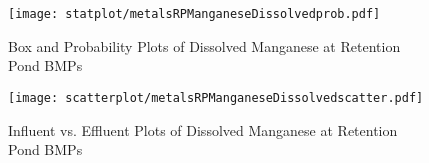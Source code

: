         \begin{figure}[hb]   %
            \centering
            \texttt{[image: statplot/metalsRPManganeseDissolvedprob.pdf]}
            \caption{Box and Probability Plots of Dissolved Manganese at Retention Pond BMPs}
        \end{figure}         %
        
        
        \begin{figure}[hb]   %
            \centering
            \texttt{[image: scatterplot/metalsRPManganeseDissolvedscatter.pdf]}
            \caption{Influent vs. Effluent Plots of Dissolved Manganese at Retention Pond BMPs}
        \end{figure}         %
        \clearpage
        